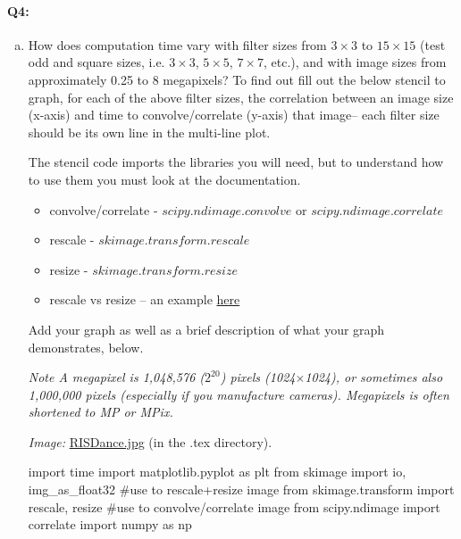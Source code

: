 
\pagebreak
\paragraph{Q4:} 
\begin{enumerate}[(a)]
    \item 
    How does computation time vary with filter sizes from $3\times3$ to $15\times15$ (test odd and square sizes, i.e. $3\times3$, $5\times5$, $7\times7$, etc.), and with image sizes from approximately 0.25 to 8 megapixels? To find out fill out the below stencil to graph, for each of the above filter sizes, the correlation between an image size (x-axis) and time to convolve/correlate (y-axis) that image– each filter size should be its own line in the multi-line plot. 
    
    The stencil code imports the libraries you will need, but to understand how to use them you must look at the documentation.
    \begin{itemize}
    \item convolve/correlate - \href{https://docs.scipy.org/doc/scipy/reference/generated/scipy.ndimage.convolve.html}{$scipy.ndimage.convolve$} or \href{https://docs.scipy.org/doc/scipy/reference/generated/scipy.ndimage.correlate.html}{$scipy.ndimage.correlate$}
    \item rescale - \href{https://scikit-image.org/docs/dev/api/skimage.transform.html#skimage.transform.rescale}{$skimage.transform.rescale$}
    \item resize - \href{https://scikit-image.org/docs/dev/api/skimage.transform.html#skimage.transform.resize}{$skimage.transform.resize$}
    \item rescale vs resize – an example \href{http://scikit-image.org/docs/dev/auto_examples/transform/plot_rescale.html}{here}
    \end{itemize} 

    
    Add your graph as well as a brief description of what your graph demonstrates, below.

\emph{Note A megapixel is 1,048,576 ($2^{20}$) pixels (1024$\times$1024), or sometimes also 1,000,000 pixels (especially if you manufacture cameras). Megapixels is often shortened to MP or MPix.}

\emph{Image:} \href{RISDance.jpg}{RISDance.jpg} (in the .tex directory).

\begin{python}
import time 
import matplotlib.pyplot as plt
from skimage import io, img_as_float32
#use to rescale+resize image
from skimage.transform import rescale, resize
#use to convolve/correlate image
from scipy.ndimage import correlate
import numpy as np


\end{python}
\end{enumerate}
